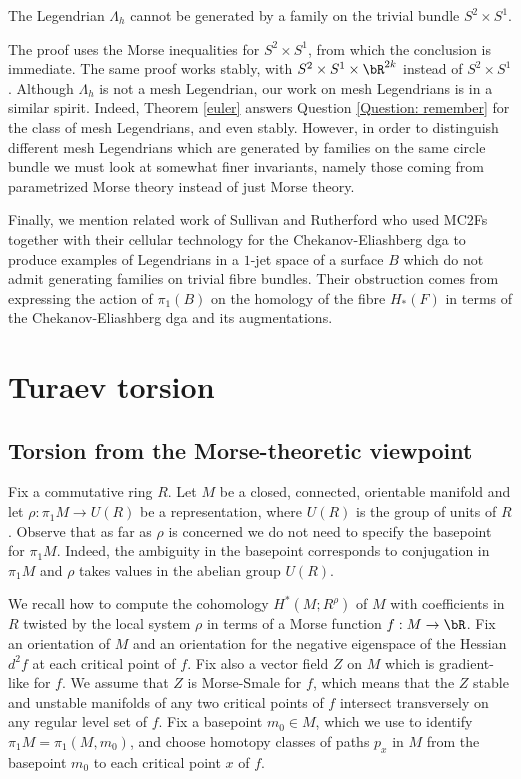 \begin{proposition}
The Legendrian $\Lambda_h$ cannot be generated by a family on the trivial bundle $S^2 \times S^1$.
\end{proposition}

The proof uses the Morse inequalities for $S^2 \times S^1$, from which the conclusion is immediate. The same proof works stably, with $S^2 \times S^1 \times \bR^{2k}$ instead of $S^2 \times S^1$. Although $\Lambda_h$ is not a mesh Legendrian, our work on mesh Legendrians is in a similar spirit. Indeed, Theorem \ref{euler} answers Question \ref{Question: remember} for the class of mesh Legendrians, and even stably. However, in order to distinguish different mesh Legendrians which are generated by families on the same circle bundle we must look at somewhat finer invariants, namely those coming from parametrized Morse theory instead of just Morse theory.

Finally, we mention related work of Sullivan and Rutherford \cite{RS18} who used MC2Fs together with their cellular technology for the Chekanov-Eliashberg dga to produce examples of Legendrians in a $1$-jet space of a surface $B$ which do not admit generating families on trivial fibre bundles. Their obstruction comes from expressing the action of $\pi_1(B)$ on the homology of the fibre $H_*(F)$ in terms of the Chekanov-Eliashberg dga and its augmentations.

\section{Turaev torsion}\label{Section: turaev torsion}

\subsection{Torsion from the Morse-theoretic viewpoint}\label{reidemeistertorsion}

Fix a commutative ring $R$. Let $M$ be a closed, connected, orientable manifold and let $\rho: \pi_1M \to U(R)$ be a representation, where $U(R)$ is the group of units of $R$. Observe that as far as $\rho$ is concerned we do not need to specify the basepoint for $\pi_1M$. Indeed, the ambiguity in the basepoint corresponds to conjugation in $\pi_1 M$ and $\rho$ takes values in the abelian group $U(R)$.

We recall how to compute the cohomology $H^*(M; R^\rho)$ of $M$ with coefficients in~$R$ twisted by the local system $\rho$ in terms of a Morse function $f:M \to \bR$. Fix an orientation of $M$ and an orientation for the negative eigenspace of the Hessian $d^2f$ at each critical point of $f$. Fix also a vector field $Z$ on $M$ which is gradient-like for $f$. We assume that $Z$ is Morse-Smale for $f$, which means that the $Z$ stable and unstable manifolds of any two critical points of $f$ intersect transversely on any regular level set of $f$. Fix a basepoint $m_0 \in M$, which we use to identify $\pi_1M=\pi_1(M,m_0)$, and choose homotopy classes of paths $p_x$ in $M$ from the basepoint $m_0$ to each critical point $x$ of $f$.

